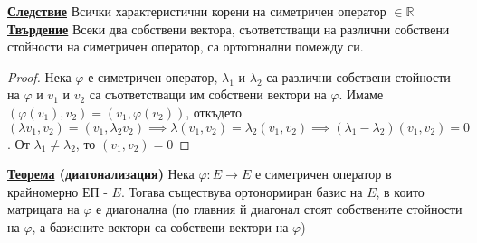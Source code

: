\documentclass{article}
\begin{document}
\textbf{\underline{Следствие}}
Всички характеристични корени на симетричен оператор $\in \mathbb{R}$ \newline\newline
\textbf{\underline{Твърдение}}
Всеки два собствени вектора, съответстващи на различни собствени стойности на симетричен оператор, са ортогонални помежду си.
\begin{proof}
Нека $\varphi$ е симетричен оператор, $\lambda_1$ и $\lambda_2$ са различни собствени стойности на $\varphi$ и $v_1$ и $v_2$ са
съответстващи им собствени вектори на $\varphi$. Имаме $(\varphi(v_1), v_2) = (v_1, \varphi(v_2))$, откъдето $(\lambda v_1, v_2)
= (v_1, \lambda_2 v_2) \implies \lambda(v_1, v_2) = \lambda_2(v_1, v_2) \implies (\lambda_1 - \lambda_2)(v_1, v_2) = 0$. От
$\lambda_1 \neq \lambda_2$, то $(v_1, v_2) = 0$ \newline
\end{proof}
\textbf{\underline{Теорема} (диагонализация)} \newline
Нека $\varphi: E \rightarrow E$ е симетричен оператор в крайномерно ЕП - $E$. Тогава съществува ортонормиран
базис на $E$, в които матрицата на $\varphi$ е диагонална (по главния й диагонал стоят собствените стойности на $\varphi$, а
базисните вектори са собствени вектори на $\varphi$)
\end{document}
